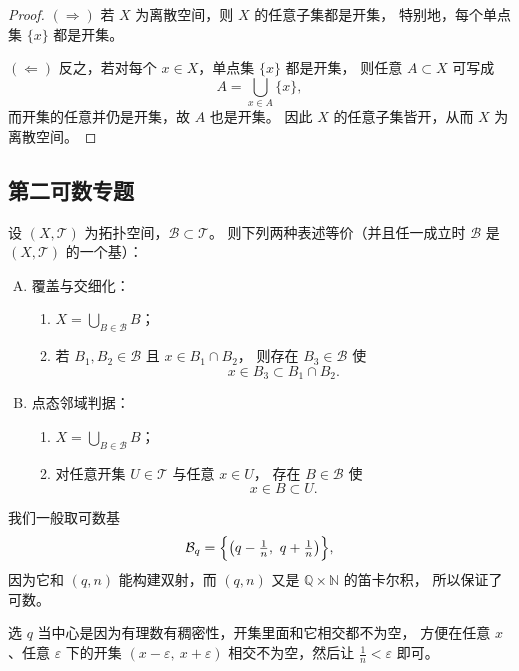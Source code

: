 \begin{example}[x∈A这种写法很妙]
    \begin{proof}
$(\Rightarrow)$ 若 $X$ 为离散空间，则 $X$ 的任意子集都是开集，
特别地，每个单点集 $\{x\}$ 都是开集。

$(\Leftarrow)$ 反之，若对每个 $x\in X$，单点集 $\{x\}$ 都是开集，
则任意 $A\subset X$ 可写成
\[
A=\bigcup_{x\in A}\{x\},
\]
而开集的任意并仍是开集，故 $A$ 也是开集。
因此 $X$ 的任意子集皆开，从而 $X$ 为离散空间。
\end{proof}
\end{example}
\subsection{第二可数专题}
\begin{proposition}[基的等价表述]
设 $(X,\mathcal T)$ 为拓扑空间，$\mathcal B\subset \mathcal T$。
则下列两种表述等价（并且任一成立时 $\mathcal B$ 是 $(X,\mathcal T)$ 的一个基）：

\begin{enumerate}[(A)]
  \item 覆盖与交细化：
  \begin{enumerate}[(1)]
    \item $X=\displaystyle\bigcup_{B\in\mathcal B}B$；
    \item 若 $B_1,B_2\in\mathcal B$ 且 $x\in B_1\cap B_2$，
    则存在 $B_3\in\mathcal B$ 使
    \[
    x\in B_3\subset B_1\cap B_2.
    \]
  \end{enumerate}

  \item 点态邻域判据：
  \begin{enumerate}[(1)]
    \item $X=\displaystyle\bigcup_{B\in\mathcal B}B$；
    \item 对任意开集 $U\in\mathcal T$ 与任意 $x\in U$，
    存在 $B\in\mathcal B$ 使
    \[
    x\in B\subset U.
    \]
  \end{enumerate}
\end{enumerate}
\end{proposition}
\begin{dxtips}
我们一般取可数基
\[
\mathcal B_q=\Bigl\{\bigl(q-\tfrac1n,\ q+\tfrac1n\bigr)\Bigr\},
\]
因为它和 $(q,n)$ 能构建双射，而 $(q,n)$ 又是 $\mathbb Q\times\mathbb N$ 的笛卡尔积，
所以保证了可数。

选 $q$ 当中心是因为有理数有稠密性，开集里面和它相交都不为空，
方便在任意 $x$、任意 $\varepsilon$ 下的开集 $(x-\varepsilon,\ x+\varepsilon)$
相交不为空，然后让 $\tfrac1n<\varepsilon$ 即可。
\end{dxtips}
